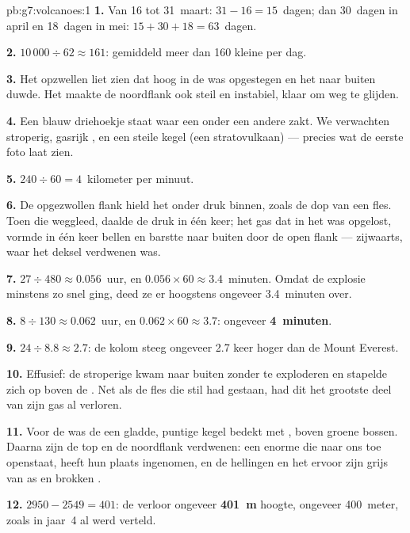 \begin{solution}{pb:g7:volcanoes:1}
\textbf{1.} Van 16 tot 31~maart: $31 - 16 = 15$~dagen; dan 30~dagen in
april en 18~dagen in mei: $15 + 30 + 18 = 63$~dagen.

\textbf{2.} $10\,000 \div 62 \approx 161$: gemiddeld meer dan 160 kleine
 per dag.

\textbf{3.} Het opzwellen liet zien dat  hoog in de  was
opgestegen en het  naar buiten duwde. Het maakte de noordflank
ook steil en instabiel, klaar om weg te glijden.

\textbf{4.} Een blauw driehoekje staat waar een  onder een andere
zakt. We verwachten stroperig, gasrijk ,  en
een steile kegel (een stratovulkaan) --- precies wat de eerste foto laat
zien.

\textbf{5.} $240 \div 60 = 4$~kilometer per minuut.

\textbf{6.} De opgezwollen flank hield het  onder druk binnen, zoals
de dop van een fles. Toen die weggleed, daalde de druk in één keer; het gas
dat in het  was opgelost, vormde in één keer bellen en barstte naar
buiten door de open flank --- zijwaarts, waar het deksel verdwenen was.

\textbf{7.} $27 \div 480 \approx 0.056$~uur, en $0.056 \times 60 \approx
3.4$~minuten. Omdat de explosie minstens zo snel ging, deed ze er
hoogstens ongeveer 3.4~minuten over.

\textbf{8.} $8 \div 130 \approx 0.062$~uur, en $0.062 \times 60 \approx
3.7$: ongeveer \textbf{4~minuten}.

\textbf{9.} $24 \div 8.8 \approx 2.7$: de kolom steeg ongeveer 2.7 keer
hoger dan de Mount Everest.

\textbf{10.} Effusief: de stroperige  kwam naar buiten zonder te
exploderen en stapelde zich op boven de . Net als de fles
die stil had gestaan, had dit  het grootste deel van zijn gas al
verloren.

\textbf{11.} Voor de  was de  een gladde, puntige kegel
bedekt met , boven groene bossen. Daarna zijn de top en de
noordflank verdwenen: een enorme  die naar ons toe openstaat, heeft
hun plaats ingenomen, en de hellingen en het  ervoor zijn grijs van as
en brokken .

\textbf{12.} $2950 - 2549 = 401$: de  verloor ongeveer
\textbf{401~m} hoogte, ongeveer 400~meter, zoals in jaar~4 al werd verteld.
\end{solution}
